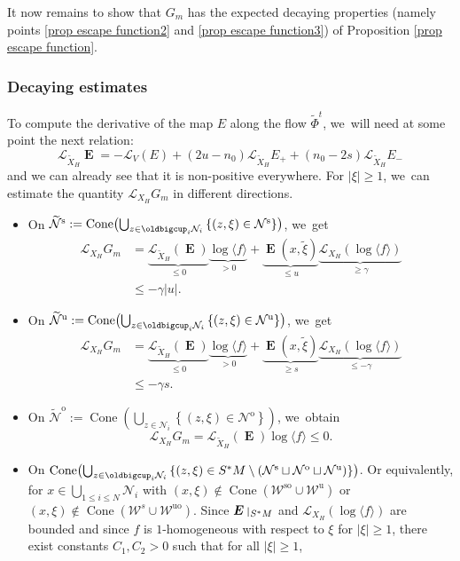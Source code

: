 \documentclass[JEP,XML,SOM,Unicode,NoEqCountersInSection,NoFloatCountersInSection,published]{cedram}
\newcommand{\ro}{\mathrm{o}}
\newcommand{\rs}{\mathrm{s}}
\newcommand{\rso}{\mathrm{so}}
\newcommand{\ru}{\mathrm{u}}
\newcommand{\ruo}{\mathrm{uo}}
\theoremstyle{definition}
\theoremstyle{plain}
\newcommand{\Lie}{\mathcal{L}}
\newcommand{\Ncal}{\mathcal{N}}
\newcommand{\Wcal}{\mathcal{W}}
\newcommand{\w}[1]{\langle {#1} \rangle}
\DeclareMathOperator{\Cone}{Cone}
\DeclareMathOperator{\E}{\boldsymbol{E}}
\def\rest#1#2{\mathchoice
{\setbox1\hbox{${\displaystyle #1}_{\scriptstyle #2}$}
\restrictionaux{#1}{#2}}
{\setbox1\hbox{${\textstyle #1}_{\scriptstyle #2}$}
\restrictionaux{#1}{#2}}
{\setbox1\hbox{${\scriptstyle #1}_{\scriptscriptstyle #2}$}
\restrictionaux{#1}{#2}}
{\setbox1\hbox{${\scriptscriptstyle #1}_{\scriptscriptstyle #2}$}
\restrictionaux{#1}{#2}}}
\def\restrictionaux#1#2{{#1\,\smash{\vrule height.8\ht1 depth.85\dp1}}_{\,#2}}
\begin{document}
It now remains to show that $G_m$ has the expected decaying properties (namely points \eqref{prop escape function2} and \eqref{prop escape function3}) of Proposition \ref{prop escape function}.

\subsubsection*{Decaying estimates}
To compute the derivative of the map $E$ along the flow $\widetilde{\Phi}^t$, we~will need at some point the next relation:
\[
\Lie_{\widetilde{X}_H} \E = - \Lie_V (E) + (2u - n_0) \Lie_{\widetilde{X}_H} E_+ + (n_0 -2s) \Lie_{\widetilde{X}_H} E_-
\]
and we can already see that it is non-positive everywhere. For $|\xi| \geq 1$, we~can estimate the quantity $\Lie_{X_H} G_m$ in different directions.
\begin{itemize}
\item On $\widetilde{\Ncal}^\rs:= \Cone \bigl(\bigcup_{z \in \oldbigcup_i \Ncal_i} \left\{ (z,\xi) \in \Ncal^\rs \right\} \bigr)$, we~get
\begin{align*}
\Lie_{X_H} G_m &= \underbrace{\Lie_{\widetilde{X}_H} (\E)}_{\leq 0} \underbrace{\log \w{f}}_{> 0} + \underbrace{\E (x,\tilde{\xi})}_{\leq u } \underbrace{\Lie_{X_H} (\log \w{f})}_{\geq \gamma} \\
&\leq - \gamma |u|.
\end{align*}
\item On $\widetilde{\Ncal}^\ru:= \Cone \bigl(\bigcup_{z \in \oldbigcup_i \Ncal_i} \left\{ (z,\xi) \in \Ncal^\ru \right\} \bigr)$, we~get
\begin{align*}
\Lie_{X_H} G_m &= \underbrace{\Lie_{\widetilde{X}_H} (\E)}_{\leq 0} \underbrace{\log \w{f}}_{> 0} + \underbrace{\E (x,\tilde{\xi})}_{\geq s} \underbrace{\Lie_{X_H} (\log \w{f})}_{\leq - \gamma} \\
&\leq - \gamma s.
\end{align*}
\item On $\widetilde{\Ncal}^\ro:= \Cone \left(\bigcup_{z \in \Ncal_i} \left\{ (z,\xi) \in \Ncal^\ro \right\}\right)$, we~obtain
\[
\Lie_{X_H} G_m = \Lie_{\widetilde{X}_H} (\E) \log \w{f} \leq 0.
\]
\item On $\Cone \bigl(\bigcup_{z \in \oldbigcup_i \Ncal_i} \left\{ (z,\xi) \in S^* M \setminus \left(\Ncal^\rs \sqcup \Ncal^\ro \sqcup \Ncal^\ru \right) \right\} \bigr)$. Or equivalently, for $x \in \bigcup_{1 \leq i \leq N} \Ncal_i$ with $(x,\xi) \notin \Cone (\Wcal^{\rso}\cup \Wcal^{\ru})$ or $(x,\xi) \notin \Cone (\Wcal^{s}\cup \Wcal^{\ruo})$. Since $\rest{\E}{S^* M}$ and $\Lie_{X_H} (\log \w{f})$ are bounded and since $f$ is $1$-homogeneous with respect to $\xi$ for $|\xi| \geq 1$, there exist constants $C_1, C_2 > 0$ such that for all $|\xi| \geq 1$,

\end{itemize}
\end{document}
